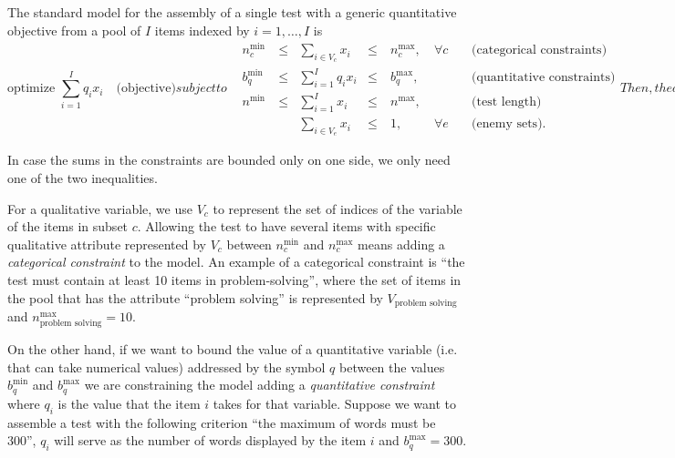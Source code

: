 The standard model for the assembly of a single test with a generic quantitative objective from a pool of $I$ items indexed by $i=1,\ldots,I$ is
\begin{subequations}\label{eq:singClassTest}
	\begin{equation}\label{eq:Sobj}
	\mbox{optimize } {\sum_{i=1}^I q_i x_{i}} \quad \mbox{(objective)}
	\end{equation}
	subject to    
	\begin{alignat}{4}
	\label{eq:Scat}
	&n^{\min}_{c} \ &\le & \sum_{i \in V_c} x_i &\le \ & n^{\max}_{c}, \ & \forall c \quad & \mbox{(categorical constraints)}\\
	\label{eq:Squan}
	&b^{\min}_{q} \ &\le & \sum_{i=1}^I q_i x_i &\le \ & b^{\max}_{q}, \ &              \quad & \mbox{(quantitative constraints)}\\
	\label{eq:Slen}
	&n^{\min}      \ &\leq & \sum_{i=1}^I x_i &\le \ & n^{\max},      \ &             \quad & \mbox{(test length)}\\
	\label{eq:Sene}
	&    \ & & \sum_{i \in V_e} x_i&\le \ & 1,              \ & \forall e \quad & \mbox{(enemy sets)}.
	\end{alignat}
	Then, the definition of variables
	\begin{equation*}
	x_i \in \{0,1\}, \ \forall i \quad \mbox{(decision variables)}.
	\end{equation*}
\end{subequations}

\noindent In case the sums in the constraints are bounded only on one side, we only need one of the two inequalities.

For a qualitative variable, we use $V_c$ to represent the set of indices of the variable of the items in subset $c$. Allowing the test to have several items with specific qualitative attribute represented by $V_c$ between $n^{\min}_{c}$ and $n^{\max}_{c}$ means adding a \textit{categorical constraint} to the model. An example of a categorical constraint is ``the test must contain at least 10 items in problem-solving'', where the set of items in the pool that has the attribute ``problem solving'' is represented by $V_\text{problem solving}$ and $n^{\max}_\text{problem solving}=10$.

On the other hand, if we want to bound the value of a quantitative variable (i.e. that can take numerical values) addressed by the symbol $q$ between the values $b^{\min}_{q}$ and     $b^{\max}_{q}$ we are constraining the model adding a \textit{quantitative constraint} where $q_i$ is the value that the item $i$ takes for that variable. Suppose we want to assemble a test with the following criterion ``the maximum of words must be 300'', $q_i$ will serve as the number of words displayed by the item $i$ and $b^{\max}_{q}=300$.

